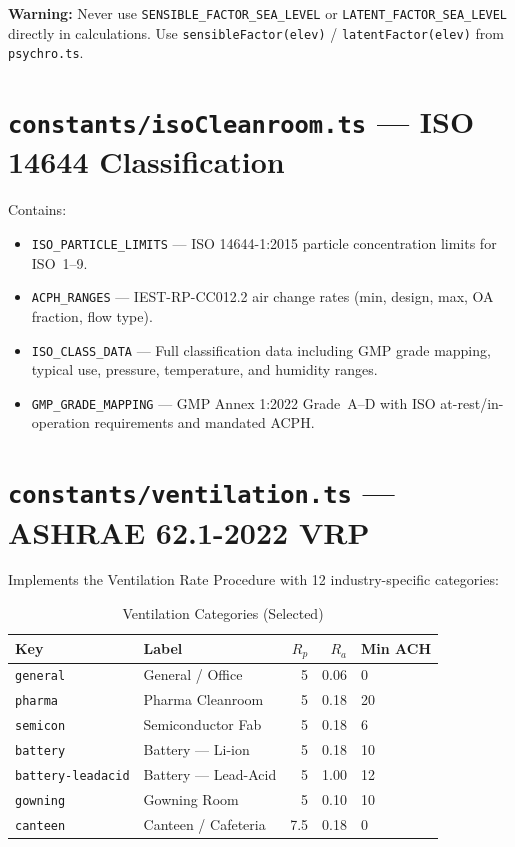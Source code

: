 \documentclass[12pt, a4paper, oneside]{report}
\newcommand{\file}[1]{\texttt{\textcolor{codeblue}{#1}}}
\newcommand{\code}[1]{\texttt{\textcolor{codered}{#1}}}
\newcommand{\warn}[1]{\textcolor{warnorange}{\textbf{Warning:}} #1}
\begin{document}
\warn{Never use \code{SENSIBLE\_FACTOR\_SEA\_LEVEL} or \code{LATENT\_FACTOR\_SEA\_LEVEL} directly in calculations. Use \code{sensibleFactor(elev)} / \code{latentFactor(elev)} from \file{psychro.ts}.}

\section{\file{constants/isoCleanroom.ts} --- ISO 14644 Classification}

Contains:
\begin{itemize}
  \item \code{ISO\_PARTICLE\_LIMITS} --- ISO 14644-1:2015 particle concentration limits for ISO~1--9.
  \item \code{ACPH\_RANGES} --- IEST-RP-CC012.2 air change rates (min, design, max, OA fraction, flow type).
  \item \code{ISO\_CLASS\_DATA} --- Full classification data including GMP grade mapping, typical use, pressure, temperature, and humidity ranges.
  \item \code{GMP\_GRADE\_MAPPING} --- GMP Annex 1:2022 Grade~A--D with ISO at-rest/in-operation requirements and mandated ACPH.
\end{itemize}

\section{\file{constants/ventilation.ts} --- ASHRAE 62.1-2022 VRP}

Implements the Ventilation Rate Procedure with 12 industry-specific categories:

\begin{table}[H]
\centering
\caption{Ventilation Categories (Selected)}
\begin{tabularx}{\textwidth}{llrrX}
\toprule
\textbf{Key} & \textbf{Label} & $R_p$ & $R_a$ & \textbf{Min ACH} \\
\midrule
\code{general}           & General / Office           & 5    & 0.06 & 0 \\
\code{pharma}            & Pharma Cleanroom           & 5    & 0.18 & 20 \\
\code{semicon}           & Semiconductor Fab          & 5    & 0.18 & 6 \\
\code{battery}           & Battery --- Li-ion         & 5    & 0.18 & 10 \\
\code{battery-leadacid}  & Battery --- Lead-Acid      & 5    & 1.00 & 12 \\
\code{gowning}           & Gowning Room               & 5    & 0.10 & 10 \\
\code{canteen}           & Canteen / Cafeteria        & 7.5  & 0.18 & 0 \\
\bottomrule
\end{tabularx}
\end{table}
\end{document}

